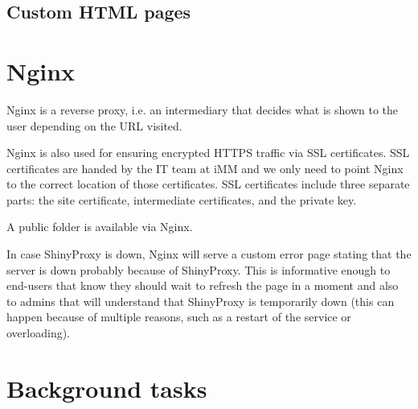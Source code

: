 
\subsection{Custom HTML pages}

\section{Nginx}

Nginx is a reverse proxy, i.e. an intermediary that decides what is shown to the user depending on the URL visited.


Nginx is also used for ensuring encrypted HTTPS traffic via SSL certificates. SSL certificates are handed by the IT team at iMM and we only need to point Nginx to the correct location of those certificates. SSL certificates include three separate parts: the site certificate, intermediate certificates, and the private key.

A public folder is available via Nginx.

In case ShinyProxy is down, Nginx will serve a custom error page stating that the server is down probably because of ShinyProxy. This is informative enough to end-users that know they should wait to refresh the page in a moment and also to admins that will understand that ShinyProxy is temporarily down (this can happen because of multiple reasons, such as a restart of the service or overloading).


\section{Background tasks}



